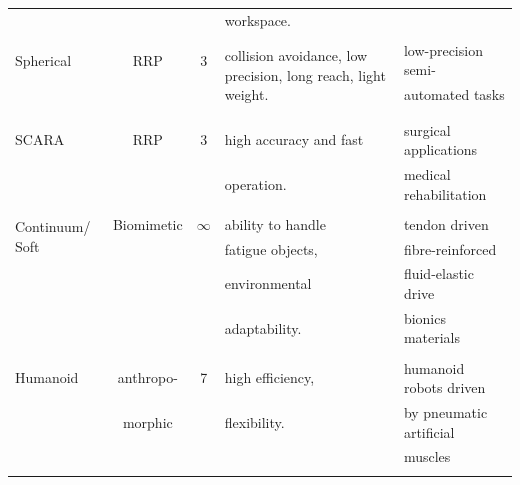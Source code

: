 \begin{center}
\begin{longtable}{l c c l l}
    & & & workspace. & \\
    & & & & \\
    Spherical \cite{RRP_feature}& RRP & 3 & 
    \multirow{3}{*}{\parbox{40mm}{collision avoidance, low precision, long reach, light weight.}} &
    low-precision semi- \\
    & & & & automated tasks \cite{RRR_application1,RRR_application2}\\
    & & & & \\
    & & & & \\
    SCARA \cite{SCARA_review}& RRP & 3 & 
    high accuracy and fast  &
    surgical applications \cite{SCARA_application1}\\
    & & & operation. & medical rehabilitation \cite{SCARA_application2}\\
    & & & & \\
    \multirow{2}{25mm}{Continuum/ Soft \cite{soft_review1,soft_review2}} & Biomimetic & $\infty$ & 
    ability to handle  & 
    tendon driven \cite{tenden_driven_application1, tenden_driven_application2,tenden_driven_application3}\\
    & & & fatigue objects, & fibre-reinforced \cite{fiber_application1,fiber_application2}\\
    & & & environmental & fluid-elastic drive \cite{fluid_application1,fluid_application2,fluid_application3}\\
    & & & adaptability. & bionics materials \cite{SMA,dielectric_high-elastic_polymers,IPMC}\\
    & & & & \\
    Humanoid & anthropo- & 7 & high efficiency, & humanoid robots driven \\
    & morphic& & flexibility.& by pneumatic artificial\\ 
    & & & & muscles \cite{humanoid_7dof}\\ 
    & & & & \\\hline
    \end{longtable}
\end{center}


